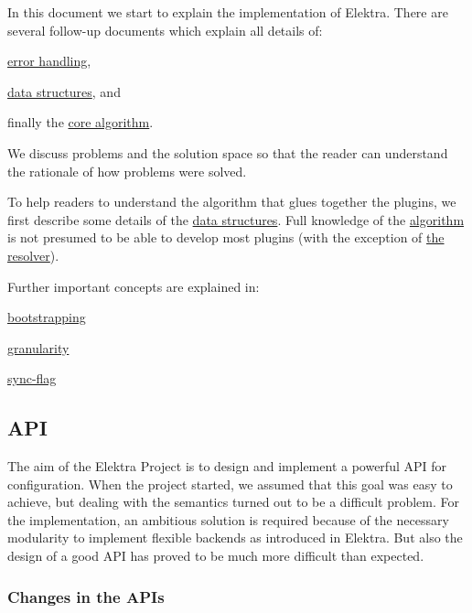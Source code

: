 In this document we start to explain the implementation of Elektra. There are several follow-\/up documents which explain all details of\+:


\begin{DoxyItemize}
\item \hyperlink{doc_dev_error-handling_md}{error handling},
\item \hyperlink{doc_dev_data-structures_md}{data structures}, and
\item finally the \hyperlink{doc_dev_algorithm_md}{core algorithm}.
\end{DoxyItemize}

We discuss problems and the solution space so that the reader can understand the rationale of how problems were solved.

To help readers to understand the algorithm that glues together the plugins, we first describe some details of the \hyperlink{doc_dev_data-structures_md}{data structures}. Full knowledge of the \hyperlink{doc_dev_algorithm_md}{algorithm} is not presumed to be able to develop most plugins (with the exception of \hyperlink{md_src_plugins_resolver_README_src_plugins_resolver_README_md}{the resolver}).

Further important concepts are explained in\+:


\begin{DoxyItemize}
\item \hyperlink{md_doc_help_elektra-bootstrapping_doc_help_elektra-bootstrapping_md}{bootstrapping}
\item \hyperlink{doc_help_elektra-granularity_md}{granularity}
\item \hyperlink{doc_help_elektra-sync-flag_md}{sync-\/flag}
\end{DoxyItemize}

\subsection*{A\+PI}

The aim of the Elektra Project is to design and implement a powerful A\+PI for configuration. When the project started, we assumed that this goal was easy to achieve, but dealing with the semantics turned out to be a difficult problem. For the implementation, an ambitious solution is required because of the necessary modularity to implement flexible backends as introduced in Elektra. But also the design of a good A\+PI has proved to be much more difficult than expected.

\subsubsection*{Changes in the A\+P\+Is}

